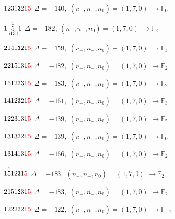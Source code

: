 \documentclass[10pt]{article}
\begin{document}
$1231321\textcolor{red}{5}$ \quad $\Delta=-140,\; (n_+,n_-,n_0)=(1,7,0)$ \quad $\to \mathbb{F}_{0}$

\smallskip

$1\overset{1}{\underset{\textcolor{red}{5}131}{5}}1$ \quad $\Delta=-182,\; (n_+,n_-,n_0)=(1,7,0)$ \quad $\to \mathbb{F}_{2}$

\smallskip

$2141321\textcolor{red}{5}$ \quad $\Delta=-159,\; (n_+,n_-,n_0)=(1,7,0)$ \quad $\to \mathbb{F}_{3}$

\smallskip

$2215131\textcolor{red}{5}$ \quad $\Delta=-182,\; (n_+,n_-,n_0)=(1,7,0)$ \quad $\to \mathbb{F}_{2}$

\smallskip

$1512231\textcolor{red}{5}$ \quad $\Delta=-183,\; (n_+,n_-,n_0)=(1,7,0)$ \quad $\to \mathbb{F}_{2}$

\smallskip

$1412321\textcolor{red}{5}$ \quad $\Delta=-161,\; (n_+,n_-,n_0)=(1,7,0)$ \quad $\to \mathbb{F}_{3}$

\smallskip

$1223131\textcolor{red}{5}$ \quad $\Delta=-139,\; (n_+,n_-,n_0)=(1,7,0)$ \quad $\to \mathbb{F}_{5}$

$1313221\textcolor{red}{5}$ \quad $\Delta=-139,\; (n_+,n_-,n_0)=(1,7,0)$ \quad $\to \mathbb{F}_{0}$

\smallskip

$1314131\textcolor{red}{5}$ \quad $\Delta=-166,\; (n_+,n_-,n_0)=(1,7,0)$ \quad $\to \mathbb{F}_{2}$

\smallskip

$1\overset{1}{5}1231\textcolor{red}{5}$ \quad $\Delta=-183,\; (n_+,n_-,n_0)=(1,7,0)$ \quad $\to \mathbb{F}_{2}$

\smallskip

$2151231\textcolor{red}{5}$ \quad $\Delta=-183,\; (n_+,n_-,n_0)=(1,7,0)$ \quad $\to \mathbb{F}_{2}$

\smallskip

$1222221\textcolor{red}{5}$ \quad $\Delta=-122,\; (n_+,n_-,n_0)=(1,7,0)$ \quad $\to \mathbb{F}_{-1}$
\end{document}
